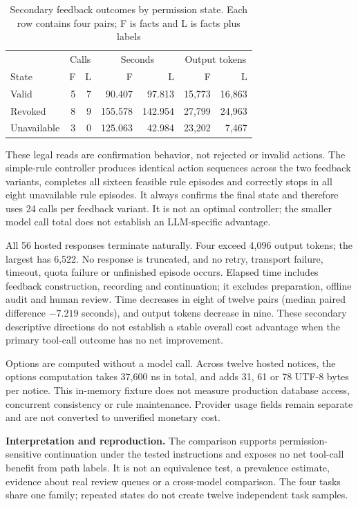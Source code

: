 \begin{table}[htbp]
\centering\small
\caption{Secondary feedback outcomes by permission state. Each row contains four pairs; F is facts and L is facts plus labels}
\label{tab:feedback-strata}
\begin{tabular}{lrrrrrr}
\toprule
 & \multicolumn{2}{c}{Calls} & \multicolumn{2}{c}{Seconds} & \multicolumn{2}{c}{Output tokens}\\
State & F & L & F & L & F & L\\
\midrule
Valid & 5 & 7 & 90.407 & 97.813 & 15,773 & 16,863\\
Revoked & 8 & 9 & 155.578 & 142.954 & 27,799 & 24,963\\
Unavailable & 3 & 0 & 125.063 & 42.984 & 23,202 & 7,467\\
\bottomrule
\end{tabular}
\end{table}
These legal reads are confirmation behavior, not rejected or invalid actions.
The simple-rule controller produces identical action sequences across the
two feedback variants, completes all sixteen feasible rule episodes and
correctly stops in all eight unavailable rule episodes. It always confirms
the final state and therefore uses 24 calls per feedback variant. It is not
an optimal controller; the smaller model call total does not establish an
LLM-specific advantage.

All 56 hosted responses terminate naturally. Four exceed 4,096 output
tokens; the largest has 6,522. No response is truncated, and no retry,
transport failure, timeout, quota failure or unfinished episode occurs.
Elapsed time includes feedback construction, recording and continuation;
it excludes preparation, offline audit and human review. Time decreases in
eight of twelve pairs (median paired difference $-7.219$ seconds), and
output tokens decrease in nine. These secondary descriptive directions do
not establish a stable overall cost advantage when the primary tool-call
outcome has no net improvement.

Options are computed without a model call. Across twelve hosted notices,
the options computation takes 37,600 ns in total, and adds 31, 61 or 78
UTF-8 bytes per notice. This in-memory fixture does not measure production
database access, concurrent consistency or rule maintenance. Provider usage
fields remain separate and are not converted to unverified monetary cost.

\textbf{Interpretation and reproduction.}
The comparison supports permission-sensitive continuation under the tested
instructions and exposes no net tool-call benefit from path labels.
It is not an equivalence test, a prevalence estimate, evidence about real
review queues or a cross-model comparison. The four tasks share one family;
repeated states do not create twelve independent task samples.

